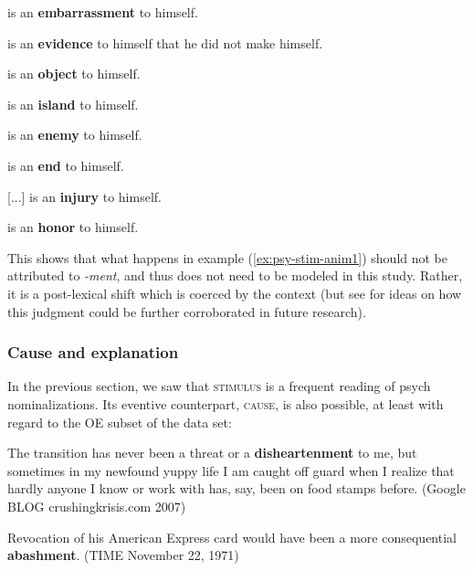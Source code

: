 \begin{exe}
	\ex \label{ex:psy-stim-anim-contexts} 
	\begin{xlist} 
	\item {} is an \textbf{embarrassment} to himself.
	\item {} is an \textbf{evidence} to himself that he did not make himself.
	\item {} is an \textbf{object} to himself.
	\item {} is an \textbf{island} to himself.
	\item {} is an \textbf{enemy} to himself.
	\item {} is an \textbf{end} to himself. 
	\item {} [...] is an \textbf{injury} to himself.
	\item {} is an \textbf{honor} to himself. 
	\end{xlist}
\end{exe}

\noindent This shows that what happens in example (\ref{ex:psy-stim-anim1}) should not be attributed to \textit{-ment}, and thus does not need to be modeled in this study. Rather, it is a post-lexical shift which is coerced by the context (but see  for ideas on how this judgment could be further corroborated in future research). 

\subsubsection{Cause and explanation}
\label{sec:psy-output-survey-caus}

In the previous section, we saw that \textsc{stimulus} is a frequent reading of psych nominalizations. Its eventive counterpart, \textsc{cause}, is also possible, at least with regard to the OE subset of the data set: 

\begin{exe}
	\ex \label{ex:psy-cause}
	\begin{xlist}
		\item \label{ex:psy-cause1}  The transition has never been a threat or a \textbf{disheartenment} to me, but sometimes in my newfound yuppy life I am caught off guard when I realize that hardly anyone I know or work with has, say, been on food stamps before. 
		{\small(Google BLOG crushingkrisis.com 2007)}
		\item \label{ex:psy-cause2} Revocation of his American Express card would have been a more consequential \textbf{abashment}. {\small(\acs{TIME} November 22, 1971)}
	\end{xlist}
\end{exe}

